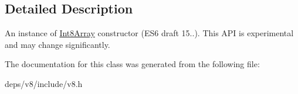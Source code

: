 \subsection{Detailed Description}
An instance of \hyperlink{classv8_1_1_int8_array}{Int8\+Array} constructor (E\+S6 draft 15..). This A\+P\+I is experimental and may change significantly. 

The documentation for this class was generated from the following file\+:\begin{DoxyCompactItemize}
\item 
deps/v8/include/v8.\+h\end{DoxyCompactItemize}
